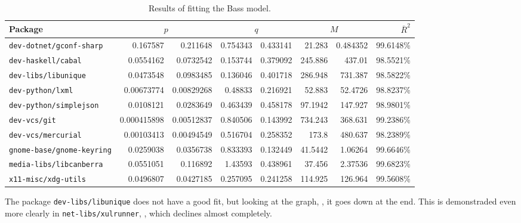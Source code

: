 \documentclass[smallextended,final]{svjour3}
\begin{document}
\begin{table}
\small\centering
\caption{Results of fitting the Bass model.}\label{tbl:results}
\begin{tabular}{lr@{ $\pm$}rr@{ $\pm$}rr@{ $\pm$}rr}
\toprule
Package & \multicolumn{2}{c}{$p$} & \multicolumn{2}{c}{$q$} & \multicolumn{2}{c}{$M$} & $\overline{R}^2$\\
\midrule
\texttt{dev-dotnet/gconf-sharp}   & 0.167587 & 0.211648 & 0.754343 & 0.433141 & 21.283 & 0.484352 & 99.6148\%\\
\texttt{dev-haskell/cabal}        & 0.0554162 & 0.0732542 & 0.153744 & 0.379092 & 245.886 & 437.01 & 98.5521\%\\
\texttt{dev-libs/libunique}       & 0.0473548 & 0.0983485 & 0.136046 & 0.401718 & 286.948 & 731.387 & 98.5822\%\\
\texttt{dev-python/lxml}          & 0.00673774 & 0.00829268 & 0.48833 & 0.216921 & 52.883 & 52.4726 & 98.8237\%\\
\texttt{dev-python/simplejson}    & 0.0108121 & 0.0283649 & 0.463439 & 0.458178 & 97.1942 & 147.927 & 98.9801\%\\
\texttt{dev-vcs/git}              & 0.000415898 & 0.00512837 & 0.840506 & 0.143992 & 734.243 & 368.631 & 99.2386\%\\
\texttt{dev-vcs/mercurial}        & 0.00103413 & 0.00494549 & 0.516704 & 0.258352 & 173.8 & 480.637 & 98.2389\%\\
\texttt{gnome-base/gnome-keyring} & 0.0259038 & 0.0356738 & 0.833393 & 0.132449 & 41.5442 & 1.06264 & 99.6646\%\\
\texttt{media-libs/libcanberra}   & 0.0551051 & 0.116892 & 1.43593 & 0.438961 & 37.456 & 2.37536 & 99.6823\%\\
\texttt{x11-misc/xdg-utils}       & 0.0496807 & 0.0427185 & 0.257095 & 0.241258 & 114.925 & 126.964 & 99.5608\%\\
\bottomrule
\end{tabular}
\end{table}


The package \texttt{dev-libs/libunique} does not have a good fit, but looking at the graph, , it goes down at the end. This is demonstraded even more clearly in \texttt{net-libs/xulrunner}, , which declines almost completely.
\end{document}

